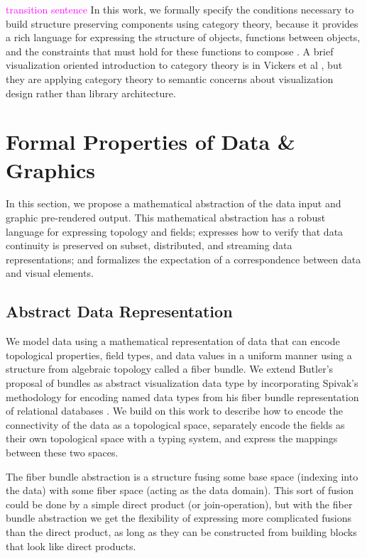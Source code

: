 \documentclass[journal]{IEEEtran}
\newcommand{\note}[1]{\textcolor{magenta}{#1}}
\theoremstyle{definition}
\theoremstyle{remark}
\begin{document}
\note{transition sentence}
In this work, we formally specify the conditions necessary to build structure preserving components using category theory, because it provides a rich language for expressing the structure of objects, functions between objects, and the constraints that must hold for these functions to compose \cite{wielsManagementEvolvingSpecifications1998,yorgeyMonoidsThemeVariations2012}. A brief visualization oriented introduction to category theory is in Vickers et al \cite{vickersUnderstandingVisualizationFormal2013}, but they are applying category theory to semantic concerns about visualization design rather than library architecture. 


\section{Formal Properties of Data \& Graphics}
\label{sec:atct}
In this section, we propose a mathematical abstraction of the data input and graphic pre-rendered output. This mathematical abstraction has a robust language for expressing topology and fields; expresses how to verify that data continuity is preserved on subset, distributed, and streaming data representations; and formalizes the expectation of a correspondence between data and visual elements. 

\subsection{Abstract Data Representation}
\label{sec:atct:fiber-bundles}
We model data using a mathematical representation of data that can encode topological properties, field types, and data values in a uniform manner using a structure from algebraic topology called a fiber bundle. We extend Butler's proposal of bundles as abstract visualization data type \cite{butlerVectorBundleClassesForm1992,butlerVisualizationModelBased1989} by incorporating Spivak's methodology for encoding named data types from his fiber bundle representation of relational databases \cite{spivakDatabasesAreCategories2010,spivakSimplicialDatabases2009}. We build on this work to describe how to encode the connectivity of the data as a topological space, separately encode the fields as their own topological space with a typing system, and express the mappings between these two spaces.

The fiber bundle abstraction is a structure fusing some \textcolor{base}{base space} (indexing into the data) with some \textcolor{fiber}{fiber space} (acting as the data domain). This sort of fusion could be done by a simple direct product (or join-operation), but with the fiber bundle abstraction we get the flexibility of expressing more complicated fusions than the direct product, as long as they can be constructed from building blocks that look like direct products.
\end{document}
